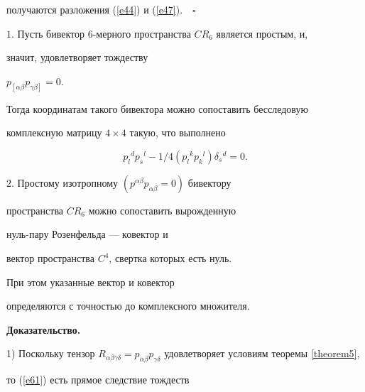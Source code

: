 получаются разложения (\ref{e44}) и (\ref{e47}).$\quad\square$





\begin{thm}


\label{theorem6}


$1.$ Пусть бивектор $6$-мерного пространства $CR_6$ является простым, и,


значит, удовлетворяет тождеству






$p_{\left[\alpha\beta\right.}p_{\gamma\beta\left.\right]}=0$.




Тогда координатам такого бивектора можно сопоставить бесследовую


комплексную матрицу $4\times 4$ такую, что выполнено


\begin{equation}


\label{e61} %


p_l{}^dp_s{}^l-1/4(p_l{}^kp_k{}^l)\delta_s{}^d=0.


\end{equation}





$2.$ Простому изотропному $(p^{\alpha\beta}p_{\alpha\beta}=0)$ бивектору


пространства $CR_6$ можно сопоставить вырожденную


нуль-пару Розенфельда --- ковектор и


вектор пространства $C^4$, свертка которых есть нуль.


При этом указанные вектор и ковектор


определяются с точностью до комплексного множителя.


\end{thm}





{\bf Доказательство.}


1) Поскольку тензор $R_{\alpha\beta\gamma\delta}=p_{\alpha\beta}


p_{\gamma\delta}$ удовлетворяет условиям теоремы \ref{theorem5},


то (\ref{e61}) есть прямое следствие тождеств


